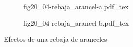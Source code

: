 \begin{figure}[h]
\captionsetup[subfigure]{aboveskip=20pt,belowskip=15pt}
\centering
\begin{subfigure}{.45\textwidth}
  \centering
        \def\svgwidth{\textwidth}
        {fig20_04-rebaja_arancel-a.pdf_tex}
\end{subfigure}\hspace{.05\textwidth}
\begin{subfigure}{.45\textwidth}
  \centering
        \def\svgwidth{\textwidth}
        {fig20_04-rebaja_arancel-b.pdf_tex}
\end{subfigure}
\caption{Efectos de una rebaja de aranceles}
\label{fig20_04-rebaja_arancel}
\end{figure}